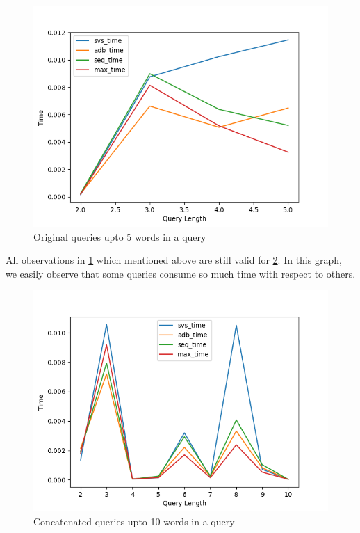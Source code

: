 \documentclass[paper=a4, fontsize=11pt]{scrartcl} %
\numberwithin{equation}{section} %
\numberwithin{figure}{section} %
\numberwithin{table}{section} %
\begin{document}
\begin{figure}[H]
   \includegraphics[width=\textwidth]{result_}
  \caption{ Original queries upto 5 words in a query}
  \label{fig:result_normal}
\end{figure}


All observations in \ref{fig:result_normal} which mentioned above are still valid for \ref{fig:result_50}. In this graph, we easily observe that some queries consume so much time with respect to others.


\begin{figure}[H]
   \includegraphics[width=\textwidth]{result_50}
  \caption{ Concatenated queries upto 10 words in a query}
  \label{fig:result_50}
\end{figure}
\end{document}
